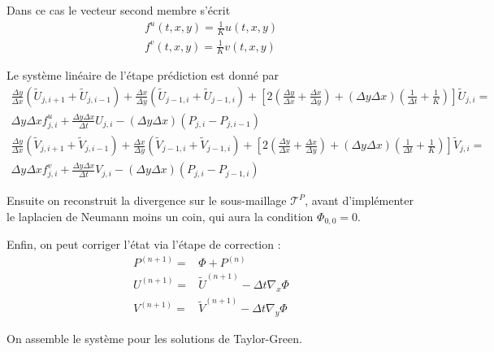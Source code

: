 Dans ce cas le vecteur second membre s'écrit
\begin{align*}
    f^u(t, x, y) = \frac{1}{K} u(t, x, y) \\
    f^v(t, x, y) = \frac{1}{K} v(t, x, y)
\end{align*}

Le système linéaire de l'étape prédiction est donné par 
\begin{align*}
    \frac{\Delta y}{\Delta x} \left( \tilde{U}_{j,i+1} + \tilde{U}_{j, i-1} \right) + \frac{\Delta x}{\Delta y} \left( \tilde{U}_{j-1,i} + \tilde{U}_{j-1, i} \right) + \left[ 2\left( \frac{\Delta y}{\Delta x} + \frac{\Delta x}{\Delta y} \right) + (\Delta y \Delta x) \left(\frac{1}{\Delta t} + \frac{1}{K} \right) \right] \tilde{U}_{j,i} = \\ \Delta y \Delta x f^u_{j,i} + \frac{\Delta y \Delta x}{\Delta t} U_{j,i} - (\Delta y \Delta x) (P_{j,i} - P_{j, i-1}) \\
    \frac{\Delta y}{\Delta x} \left( \tilde{V}_{j,i+1} + \tilde{V}_{j, i-1} \right) + \frac{\Delta x}{\Delta y} \left( \tilde{V}_{j-1,i} + \tilde{V}_{j-1, i} \right) + \left[ 2\left( \frac{\Delta y}{\Delta x} + \frac{\Delta x}{\Delta y} \right) + (\Delta y \Delta x) \left(\frac{1}{\Delta t} + \frac{1}{K} \right) \right] \tilde{V}_{j,i} = \\ \Delta y \Delta x f^v_{j,i} + \frac{\Delta y \Delta x}{\Delta t} V_{j,i} - (\Delta y \Delta x) (P_{j,i} - P_{j-1, i})
\end{align*}

Ensuite on reconstruit la divergence sur le sous-maillage $\mathcal{T}^P$, avant d'implémenter le laplacien de Neumann moins un coin, qui aura la condition $\Phi_{0,0} = 0$.

Enfin, on peut corriger l'état via l'étape de correction :
\begin{align*}
    P^{(n+1)} = & \Phi + P^{(n)} \\
    U^{(n+1)} = & \tilde{U}^{(n+1)} - \Delta t \nabla_x \Phi \\
    V^{(n+1)} = & \tilde{V}^{(n+1)} - \Delta t \nabla_y \Phi
\end{align*}

On assemble le système pour les solutions de Taylor-Green. 

